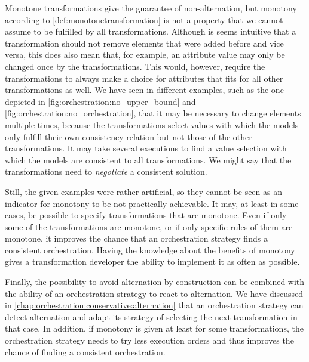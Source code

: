 Monotone transformations give the guarantee of non-alternation, but monotony according to \autoref{def:monotonetransformation} is not a property that we cannot assume to be fulfilled by all transformations.
Although is seems intuitive that a transformation should not remove elements that were added before and vice versa, this does also mean that, for example, an attribute value may only be changed once by the transformations.
This would, however, require the transformations to always make a choice for attributes that fits for all other transformations as well.
We have seen in different examples, such as the one depicted in \autoref{fig:orchestration:no_upper_bound} and \autoref{fig:orchestration:no_orchestration}, that it may be necessary to change elements multiple times, because the transformations select values with which the models only fulfill their own consistency relation but not those of the other transformations.
It may take several executions to find a value selection with which the models are consistent to all transformations.
We might say that the transformations need to \emph{negotiate} a consistent solution.

Still, the given examples were rather artificial, so they cannot be seen as an indicator for monotony to be not practically achievable.
It may, at least in some cases, be possible to specify transformations that are monotone.
Even if only some of the transformations are monotone, or if only specific rules of them are monotone, it improves the chance that an orchestration strategy finds a consistent orchestration.
Having the knowledge about the benefits of monotony gives a transformation developer the ability to implement it as often as possible.

Finally, the possibility to avoid alternation by construction can be combined with the ability of an orchestration strategy to react to alternation.
We have discussed in \autoref{chap:orchestration:conservative:alternation} that an orchestration strategy can detect alternation and adapt its strategy of selecting the next transformation in that case.
In addition, if monotony is given at least for some transformations, the orchestration strategy needs to try less execution orders and thus improves the chance of finding a consistent orchestration.


